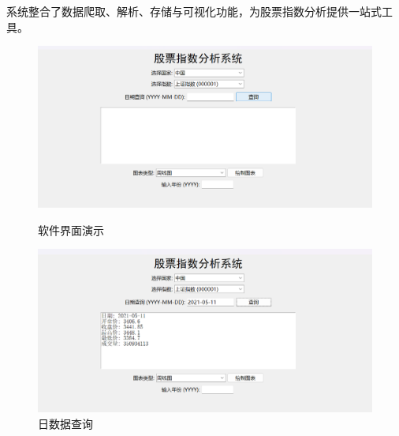 \documentclass{ctexart}
\begin{document}
系统整合了数据爬取、解析、存储与可视化功能，为股票指数分析提供一站式工具。
\begin{figure}[htbp]
	\centering
	\begin{minipage}{0.49\linewidth}
		\centering
		\includegraphics[width=0.9\linewidth]{demonstrations_ex.png}
		\caption{软件界面演示}
		\label{软件界面演示}%
	\end{minipage}
	\begin{minipage}{0.49\linewidth}
		\centering
		\includegraphics[width=0.9\linewidth]{daily_lookup.png}
		\caption{日数据查询}
	\end{minipage}
\end{figure}
\end{document}
